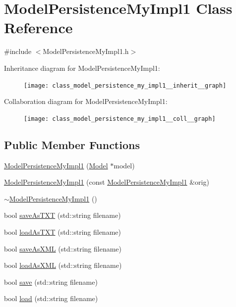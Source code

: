 \hypertarget{class_model_persistence_my_impl1}{\section{Model\-Persistence\-My\-Impl1 Class Reference}
\label{class_model_persistence_my_impl1}
}


{\ttfamily \#include $<$Model\-Persistence\-My\-Impl1.\-h$>$}



Inheritance diagram for Model\-Persistence\-My\-Impl1\-:\nopagebreak
\begin{figure}[H]
\begin{center}
\leavevmode
\texttt{[image: class\_model\_persistence\_my\_impl1\_\_inherit\_\_graph]}
\end{center}
\end{figure}


Collaboration diagram for Model\-Persistence\-My\-Impl1\-:\nopagebreak
\begin{figure}[H]
\begin{center}
\leavevmode
\texttt{[image: class\_model\_persistence\_my\_impl1\_\_coll\_\_graph]}
\end{center}
\end{figure}
\subsection*{Public Member Functions}
\begin{DoxyCompactItemize}
\item 
\hyperlink{class_model_persistence_my_impl1_a1f1c3099ee5470514ac021fbe8f6fac0}{Model\-Persistence\-My\-Impl1} (\hyperlink{class_model}{Model} $\ast$model)
\item 
\hyperlink{class_model_persistence_my_impl1_a3df2056ec9c57daea05630b3df1439b8}{Model\-Persistence\-My\-Impl1} (const \hyperlink{class_model_persistence_my_impl1}{Model\-Persistence\-My\-Impl1} \&orig)
\item 
\hyperlink{class_model_persistence_my_impl1_ab84fa247d7415d856141a8932502c362}{$\sim$\-Model\-Persistence\-My\-Impl1} ()
\item 
bool \hyperlink{class_model_persistence_my_impl1_a367b40dfac801508f75a3176f7b40c6a}{save\-As\-T\-X\-T} (std\-::string filename)
\item 
bool \hyperlink{class_model_persistence_my_impl1_aa4cf0301bf21bc177eee3e9f9320c382}{load\-As\-T\-X\-T} (std\-::string filename)
\item 
bool \hyperlink{class_model_persistence_my_impl1_a0a4c157a22510a188c4b76324ea666b0}{save\-As\-X\-M\-L} (std\-::string filename)
\item 
bool \hyperlink{class_model_persistence_my_impl1_a9047bd5d2f72ef6978cf27a8df38b7b5}{load\-As\-X\-M\-L} (std\-::string filename)
\item 
bool \hyperlink{class_model_persistence_my_impl1_ab24f2e3aea25d628748dd8b9e63d326a}{save} (std\-::string filename)
\item 
bool \hyperlink{class_model_persistence_my_impl1_a5e35c3da319f209a8d2585ec6e781a45}{load} (std\-::string filename)
\end{DoxyCompactItemize}


